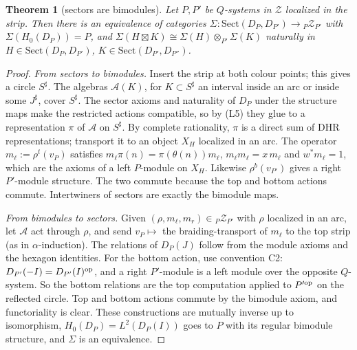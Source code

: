 \documentclass[11pt]{article}
\newtheorem{theorem}{Theorem}[section]
\theoremstyle{definition}
\theoremstyle{remark}
\newcommand{\cA}{\mathcal A}
\newcommand{\fus}{\boxtimes}
\begin{document}
\begin{theorem}[sectors are bimodules]\label{thm:sectors}
Let $P,P'$ be $Q$-systems in $\mathcal Z$ localized in the strip. Then there is an equivalence of categories $\Sigma\colon\mathrm{Sect}(D_P,D_{P'})\to{}_P\mathcal Z_{P'}$ with $\Sigma(H_0(D_P))=P$, and $\Sigma(H\fus K)\cong\Sigma(H)\otimes_{P'}\Sigma(K)$ naturally in $H\in\mathrm{Sect}(D_P,D_{P'})$, $K\in\mathrm{Sect}(D_{P'},D_{P''})$.
\end{theorem}
\begin{proof}
\emph{From sectors to bimodules.} Insert the strip at both colour points; this gives a circle $S^\sharp$. The algebras $\cA(K)$, for $K\subset S^\sharp$ an interval inside an arc or inside some $J^\sharp$, cover $S^\sharp$. The sector axioms and naturality of $D_P$ under the structure maps make the restricted actions compatible, so by (L5) they glue to a representation $\pi$ of $\cA$ on $S^\sharp$. By complete rationality, $\pi$ is a direct sum of DHR representations; transport it to an object $X_H$ localized in an arc. The operator $m_\ell:=\rho^t(v_P)$ satisfies $m_\ell\pi(n)=\pi(\theta(n))m_\ell$, $m_\ell m_\ell=x\,m_\ell$ and $w^*m_\ell=1$, which are the axioms of a left $P$-module on $X_H$. Likewise $\rho^b(v_{P'})$ gives a right $P'$-module structure. The two commute because the top and bottom actions commute. Intertwiners of sectors are exactly the bimodule maps.

\emph{From bimodules to sectors.} Given $(\rho,m_\ell,m_r)\in{}_P\mathcal Z_{P'}$ with $\rho$ localized in an arc, let $\cA$ act through $\rho$, and send $v_P\mapsto$ the braiding-transport of $m_\ell$ to the top strip (as in $\alpha$-induction). The relations of $D_P(J)$ follow from the module axioms and the hexagon identities. For the bottom action, use convention C2: $D_{P'}(-I)=D_{P'}(I)^{\rm op}$, and a right $P'$-module is a left module over the opposite $Q$-system. So the bottom relations are the top computation applied to $P'^{\rm op}$ on the reflected circle. Top and bottom actions commute by the bimodule axiom, and functoriality is clear. These constructions are mutually inverse up to isomorphism, $H_0(D_P)=L^2(D_P(I))$ goes to $P$ with its regular bimodule structure, and $\Sigma$ is an equivalence.


\end{proof}
\end{document}
